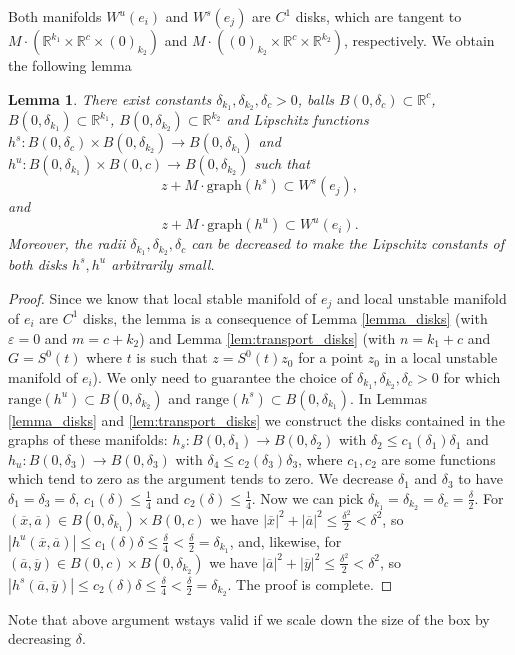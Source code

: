 \documentclass[11pt, leqno]{amsart}
\newtheorem{lem}[thm]{Lemma}
\theoremstyle{definition}
\def\R{\mathbb{R}}
\begin{document}
Both manifolds $W^u(e_i)$ and $W^s(e_j)$ are $C^1$ disks, which are tangent to $M\cdot   (  \mathbb{R}^{k_1}\times \mathbb{R}^c \times (0)_{k_2})$ and $M\cdot   ( (0)_{k_2}\times \mathbb{R}^c \times \mathbb{R}^{k_2})$, respectively. We obtain the following lemma 
\begin{lem}\label{lem:box}
	There exist constants $\delta_{k_1}, \delta_{k_2}, \delta_c > 0$, balls $B(0,\delta_c)\subset \R^c$, $ B(0,\delta_{k_1})\subset \R^{k_1}$, $ B(0,\delta_{k_2})\subset \R^{k_2}$  and Lipschitz functions $h^s:B(0,\delta_c)\times B(0,\delta_{k_2}) \to B(0,\delta_{k_1})$ and $h^u: B(0,\delta_{k_1})\times B(0,c) \to B(0,\delta_{k_2})$ such that
	\begin{equation}\label{eq:disk_1}
	z+ M \cdot \textrm{graph}(h^s)\subset  W^s(e_j),
	\end{equation}
	and
	\begin{equation}\label{eq:disk_2}
	z+M \cdot \textrm{graph}(h^u) \subset W^u(e_i).
	\end{equation}
	Moreover, the radii $\delta_{k_1}, \delta_{k_2}, \delta_c$ can be decreased to make the Lipschitz constants of both disks $h^s, h^u$ arbitrarily small.
\end{lem}
\begin{proof}
	Since we know that local stable manifold of $e_j$ and local unstable manifold of $e_i$ are $C^1$ disks, the lemma is a consequence of Lemma \ref{lemma_disks} (with $\varepsilon = 0$ and $m=c+k_2$) and Lemma \ref{lem:transport_disks}  (with $n=k_1+c$ and $G=S^0(t)$ where $t$ is such that $z=S^0(t)z_0$ for a point $z_0$ in a local unstable manifold of $e_i$).  We only need to guarantee the choice of $\delta_{k_1}, \delta_{k_2}, \delta_c > 0$ for which $\text{range}(h^u)\subset  B(0,\delta_{k_2})$ and $\text{range}(h^s) \subset B(0,\delta_{k_1})$. 
	In Lemmas \ref{lemma_disks} and \ref{lem:transport_disks} we construct the disks contained in the graphs of these manifolds: $h_s:B(0,\delta_1)\to B(0,\delta_2)$ with $\delta_2 \leq c_1(\delta_1)\delta_1$ and $h_u:B(0,\delta_3)\to B(0,\delta_3)$ with $\delta_4 \leq c_2(\delta_3)\delta_3$, where $c_1, c_2$ are some functions which tend to zero as the argument tends to zero. We decrease $\delta_1$ and $\delta_3$  to have $\delta_1=\delta_3=\delta$,  $c_1(\delta)\leq \frac{1}{4}$ and $c_2(\delta)\leq \frac{1}{4}$. Now we can pick $\delta_{k_1} = \delta_{k_2} = \delta_c = \frac{\delta}{2}$. 
	For $(\overline{x},\overline{a}) \in B(0,\delta_{k_1})\times B(0,c)$ we have $|\overline{x}|^2+|\overline{a}|^2\leq \frac{\delta^2}{2} < \delta^2$, so 
	$|h^u(\overline{x},\overline{a})|\leq c_1(\delta)\delta \leq \frac{\delta}{4} < \frac{\delta}{2} = \delta_{k_1}$, and, likewise, for $(\overline{a},\overline{y}) \in B(0,c)\times B(0,\delta_{k_2})$ we have $|\overline{a}|^2+|\overline{y}|^2\leq \frac{\delta^2}{2} < \delta^2$, so 
	$|h^s(\overline{a},\overline{y})|\leq c_2(\delta)\delta \leq \frac{\delta}{4} < \frac{\delta}{2} = \delta_{k_2}$. The proof is complete. 
	\end{proof}
Note that above argument wstays valid if we scale down the size of the box by decreasing $\delta$. 
\end{document}
